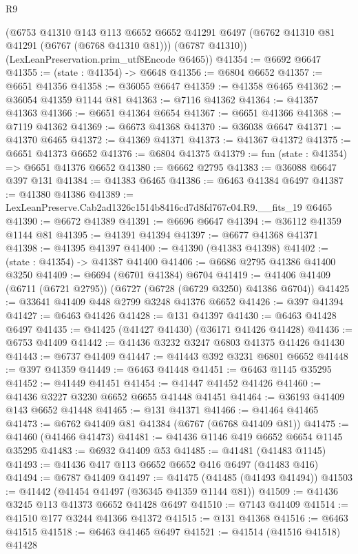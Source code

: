 \begin{lexlean}{R9}
\begin{coremodule}
      (@6753
        @41310
        @143
        @113
        @6652
        @6652
        @41291
        @6497
        (@6762 @41310 @81 @41291 (@6767 (@6768 @41310 @81)))
        (@6787 @41310))
      (LexLeanPreservation.prim_utf8Encode @6465))
@41354 := @6692 @6647
@41355 := (state : @41354) -> @6648
@41356 := @6804 @6652
@41357 := @6651 @41356
@41358 := @36055 @6647
@41359 := @41358 @6465
@41362 := @36054 @41359 @1144 @81
@41363 := @7116 @41362
@41364 := @41357 @41363
@41366 := @6651 @41364 @6654
@41367 := @6651 @41366
@41368 := @7119 @41362
@41369 := @6673 @41368
@41370 := @36038 @6647
@41371 := @41370 @6465
@41372 := @41369 @41371
@41373 := @41367 @41372
@41375 := @6651 @41373 @6652
@41376 := @6804 @41375
@41379 := fun (state : @41354) => @6651 @41376 @6652
@41380 := @6662 @2795
@41383 := @36088 @6647 @397 @131
@41384 := @41383 @6465
@41386 := @6463 @41384 @6497
@41387 := @41380 @41386
@41389 := LexLeanPreserve.Cab2ad1326c1514b8416cd7d8fd767c04.R9.__fits_19 @6465
@41390 := @6672 @41389
@41391 := @6696 @6647
@41394 := @36112 @41359 @1144 @81
@41395 := @41391 @41394
@41397 := @6677 @41368 @41371
@41398 := @41395 @41397
@41400 := @41390 (@41383 @41398)
@41402 := (state : @41354) -> @41387 @41400
@41406 := @6686 @2795 @41386 @41400 @3250
@41409 := @6694 (@6701 @41384) @6704
@41419 := @41406 @41409 (@6711 (@6721 @2795)) (@6727 (@6728 (@6729 @3250) @41386 @6704))
@41425 := @33641 @41409 @448 @2799 @3248 @41376 @6652
@41426 := @397 @41394
@41427 := @6463 @41426
@41428 := @131 @41397
@41430 := @6463 @41428 @6497
@41435 := @41425 (@41427 @41430) (@36171 @41426 @41428)
@41436 := @6753 @41409
@41442 := @41436 @3232 @3247 @6803 @41375 @41426 @41430
@41443 := @6737 @41409
@41447 := @41443 @392 @3231 @6801 @6652
@41448 := @397 @41359
@41449 := @6463 @41448
@41451 := @6463 @1145 @35295
@41452 := @41449 @41451
@41454 := @41447 @41452 @41426
@41460 := @41436 @3227 @3230 @6652 @6655 @41448 @41451
@41464 := @36193 @41409 @143 @6652 @41448
@41465 := @131 @41371
@41466 := @41464 @41465
@41473 := @6762 @41409 @81 @41384 (@6767 (@6768 @41409 @81))
@41475 := @41460 (@41466 @41473)
@41481 := @41436 @1146 @419 @6652 @6654 @1145 @35295
@41483 := @6932 @41409 @53
@41485 := @41481 (@41483 @1145)
@41493 := @41436 @417 @113 @6652 @6652 @416 @6497 (@41483 @416)
@41494 := @6787 @41409
@41497 := @41475 (@41485 (@41493 @41494))
@41503 := @41442 (@41454 @41497 (@36345 @41359 @1144 @81))
@41509 := @41436 @3245 @113 @41373 @6652 @41428 @6497
@41510 := @7143 @41409
@41514 := @41510 @177 @3244 @41366 @41372
@41515 := @131 @41368
@41516 := @6463 @41515
@41518 := @6463 @41465 @6497
@41521 := @41514 (@41516 @41518) @41428

\end{coremodule}
\end{lexlean}

